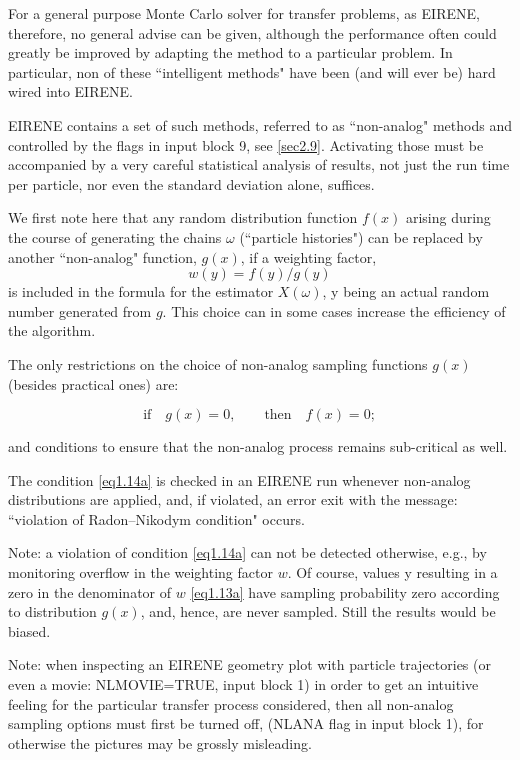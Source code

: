 For a general purpose Monte Carlo solver for transfer problems, as EIRENE,
therefore, no general advise can be given, although the performance often could
greatly be improved by adapting the method to a particular problem.
In particular, non of these ``intelligent methods" have been (and will ever be)
hard wired into EIRENE.

EIRENE contains a set of such methods, referred to as ``non-analog" methods and
controlled by the flags in input block 9, see \cref{sec2.9}.
Activating those must be accompanied by a very careful statistical analysis of
results, not just the run time per particle, nor even the standard deviation
alone, suffices.

We first note here that any random distribution function $f(x)$ arising during
the course of generating the chains $\omega$ (``particle histories") can be
replaced by another ``non-analog" function, $ g(x)$, if a weighting factor,
\begin{equation}
  \label{eq1.13a} w(y) = f(y) / g(y)
\end{equation}
is included
in the formula for the estimator $X(\omega )$, y being an actual random number
generated from $ g $.
This choice can in some cases increase the efficiency of the algorithm.

The only restrictions on the choice of non-analog sampling functions $g(x)$
(besides practical ones) are:

\begin{equation}
  \label{eq1.14a}
  \mbox{if} \quad  g(x) = 0, \qquad \mbox{then}  \quad f(x)
  = 0;
\end{equation}

and conditions to ensure that the non-analog process remains
sub-critical as well.

The condition \cref{eq1.14a} is checked in an EIRENE run whenever non-analog
distributions are applied, and, if violated, an error exit with the message:
``violation of Radon--Nikodym condition" occurs.

Note: a violation of condition \cref{eq1.14a} can not be detected otherwise,
e.g., by monitoring overflow in the weighting factor $w$.
Of course, values y resulting in a zero in the denominator of $w$
\cref{eq1.13a} have sampling probability zero according to distribution $g(x)$,
and, hence, are never sampled.
Still the results would be biased.

Note: when inspecting an EIRENE geometry plot with particle trajectories (or
even a movie: NLMOVIE=TRUE, input block 1) in order to get an intuitive feeling
for the particular transfer process considered, then all non-analog sampling
options must first be turned off, (NLANA flag in input block 1), for otherwise
the pictures may be grossly misleading.

